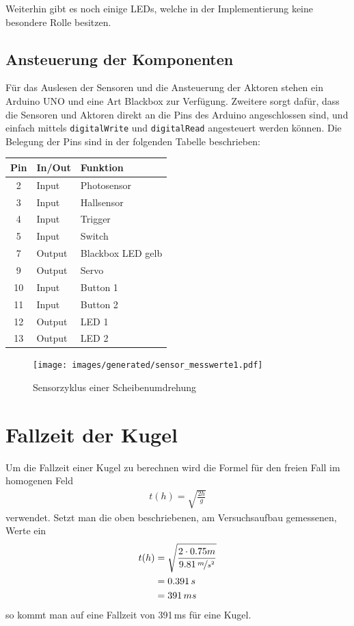 Weiterhin gibt es noch einige LEDs, welche in der Implementierung keine besondere Rolle besitzen.

\subsection{Ansteuerung der Komponenten}
Für das Auslesen der Sensoren und die Ansteuerung der Aktoren stehen ein Arduino UNO und eine Art Blackbox zur Verfügung.
Zweitere sorgt dafür, dass die Sensoren und Aktoren direkt an die Pins des Arduino angeschlossen sind, und einfach mittels \texttt{digitalWrite} und \texttt{digitalRead} angesteuert werden können.
Die Belegung der Pins sind in der folgenden Tabelle beschrieben:


\begin{center}
\begin{tabular}{cll} 
	\textbf{Pin} 	& \textbf{In/Out} & \textbf{Funktion}	\\
	\toprule
	2 &	Input &	Photosensor \\
	3 &	Input &	Hallsensor\\
	4 &	Input &	Trigger\\
	5 &	Input &	Switch\\
	7 &	Output &	Blackbox LED gelb\\
	9 &	Output &	Servo\\
	10 &	Input &	Button 1\\
	11 &	Input &	Button 2\\
	12 &	Output &	LED 1\\
	13 &	Output &	LED 2\\
	\bottomrule
\end{tabular}
\end{center}

\begin{figure}[h] \centering
	\texttt{[image: images/generated/sensor\_messwerte1.pdf]}
	\caption{Sensorzyklus einer Scheibenumdrehung}
	\label{img:sensorwerte}
\end{figure}

\section{Fallzeit der Kugel}
Um die Fallzeit einer Kugel zu berechnen wird die Formel für den freien Fall im homogenen Feld
\begin{align}
	t(h) = \sqrt{\frac{2h}{g}}
\end{align}
verwendet.
Setzt man die oben beschriebenen, am Versuchsaufbau gemessenen, Werte ein
\begin{align}
t(h) &= \sqrt{\frac{2 \cdot 0.75m}{9.81\,\nicefrac{m}{s^2}}} \\
	 &= 0.391\,s \\
	 &= 391\,ms
\end{align}
so kommt man auf eine Fallzeit von 391\,ms für eine Kugel.

